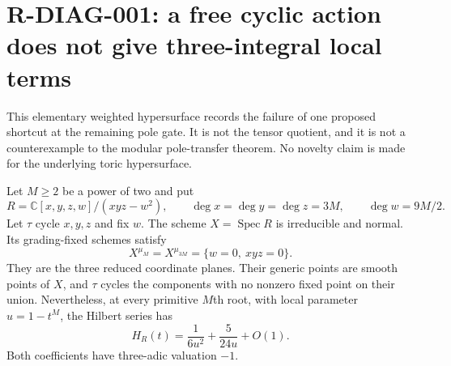 \section{R-DIAG-001: a free cyclic action does not give three-integral local terms}

This elementary weighted hypersurface records the failure of one
proposed shortcut at the remaining pole gate. It is not the tensor
quotient, and it is not a counterexample to the modular pole-transfer
theorem. No novelty claim is made for the underlying toric hypersurface.

Let $M\ge2$ be a power of two and put
\[
 R=\mathbb C[x,y,z,w]/(xyz-w^2),\qquad
 \deg x=\deg y=\deg z=3M,\qquad \deg w=9M/2.
                                                        \tag{R-DIAG-001a}
\]
Let $\tau$ cycle $x,y,z$ and fix $w$. The scheme
$X=\operatorname{Spec}R$ is irreducible and normal. Its grading-fixed
schemes satisfy
\[
 X^{\mu_M}=X^{\mu_{3M}}=\{w=0,\ xyz=0\}.
                                                        \tag{R-DIAG-001b}
\]
They are the three reduced coordinate planes. Their generic points
are smooth points of $X$, and $\tau$ cycles the components with no
nonzero fixed point on their union. Nevertheless, at every primitive
$M$th root, with local parameter $u=1-t^M$, the Hilbert series has
\[
 H_R(t)=\frac1{6u^2}+\frac5{24u}+O(1).
                                                        \tag{R-DIAG-001c}
\]
Both coefficients have three-adic valuation $-1$.

